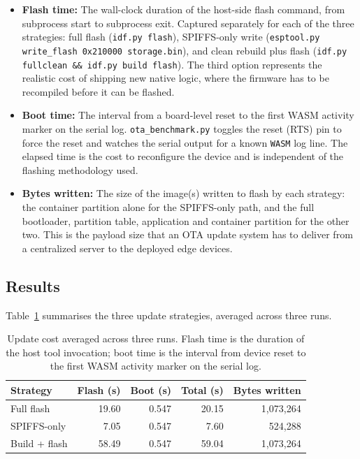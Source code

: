 \documentclass[12pt, a4paper]{report}
\begin{document}
\begin{itemize}
  \item \textbf{Flash time:} The wall-clock duration of the host-side flash command, from subprocess start to subprocess exit. Captured separately for each of the three strategies: full flash (\texttt{idf.py flash}), SPIFFS-only write (\texttt{esptool.py write\_flash 0x210000 storage.bin}), and clean rebuild plus flash (\texttt{idf.py fullclean \&\& idf.py build flash}). The third option represents the realistic cost of shipping new native logic, where the firmware has to be recompiled before it can be flashed.
  \item \textbf{Boot time:} The interval from a board-level reset to the first WASM activity marker on the serial log. \texttt{ota\_benchmark.py} toggles the reset (RTS) pin to force the reset and watches the serial output for a known \texttt{WASM} log line. The elapsed time is the cost to reconfigure the device and is independent of the flashing methodology used. 
  \item \textbf{Bytes written:} The size of the image(s) written to flash by each strategy: the container partition alone for the SPIFFS-only path, and the full bootloader, partition table, application and container partition for the other two. This is the payload size that an OTA update system has to deliver from a centralized server to the deployed edge devices.
\end{itemize}

\subsection{Results}
\label{subsec:containerization-ota-results}

Table~\ref{tab:ota-strategies} summarises the three update strategies, averaged across three runs.

\begin{table}[htbp]
\centering
\small
\begin{tabular}{@{}lrrrr@{}}
\toprule
\textbf{Strategy} & \textbf{Flash (s)} & \textbf{Boot (s)} & \textbf{Total (s)} & \textbf{Bytes written} \\
\midrule
Full flash            & 19.60 & 0.547 & 20.15 & 1{,}073{,}264 \\
SPIFFS-only           &  7.05 & 0.547 &  7.60 &   524{,}288 \\
Build + flash         & 58.49 & 0.547 & 59.04 & 1{,}073{,}264 \\
\bottomrule
\end{tabular}
\caption{Update cost averaged across three runs. Flash time is the duration of the host tool invocation; boot time is the interval from device reset to the first WASM activity marker on the serial log.}
\label{tab:ota-strategies}
\end{table}
\end{document}
